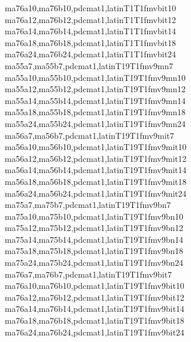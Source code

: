         {ma76a10,ma76b10,pdcmat1,latin}{T1}{T1}{fmv}{b}{it}{10}
        {ma76a12,ma76b12,pdcmat1,latin}{T1}{T1}{fmv}{b}{it}{12}
        {ma76a14,ma76b14,pdcmat1,latin}{T1}{T1}{fmv}{b}{it}{14}
        {ma76a18,ma76b18,pdcmat1,latin}{T1}{T1}{fmv}{b}{it}{18}
        {ma76a24,ma76b24,pdcmat1,latin}{T1}{T1}{fmv}{b}{it}{24}
        {ma55a7,ma55b7,pdcmat1,latin}{T19}{T1}{fmv9}{m}{n}{7}
        {ma55a10,ma55b10,pdcmat1,latin}{T19}{T1}{fmv9}{m}{n}{10}
        {ma55a12,ma55b12,pdcmat1,latin}{T19}{T1}{fmv9}{m}{n}{12}
        {ma55a14,ma55b14,pdcmat1,latin}{T19}{T1}{fmv9}{m}{n}{14}
        {ma55a18,ma55b18,pdcmat1,latin}{T19}{T1}{fmv9}{m}{n}{18}
        {ma55a24,ma55b24,pdcmat1,latin}{T19}{T1}{fmv9}{m}{n}{24}
        {ma56a7,ma56b7,pdcmat1,latin}{T19}{T1}{fmv9}{m}{it}{7}
        {ma56a10,ma56b10,pdcmat1,latin}{T19}{T1}{fmv9}{m}{it}{10}
        {ma56a12,ma56b12,pdcmat1,latin}{T19}{T1}{fmv9}{m}{it}{12}
        {ma56a14,ma56b14,pdcmat1,latin}{T19}{T1}{fmv9}{m}{it}{14}
        {ma56a18,ma56b18,pdcmat1,latin}{T19}{T1}{fmv9}{m}{it}{18}
        {ma56a24,ma56b24,pdcmat1,latin}{T19}{T1}{fmv9}{m}{it}{24}
        {ma75a7,ma75b7,pdcmat1,latin}{T19}{T1}{fmv9}{b}{n}{7}
        {ma75a10,ma75b10,pdcmat1,latin}{T19}{T1}{fmv9}{b}{n}{10}
        {ma75a12,ma75b12,pdcmat1,latin}{T19}{T1}{fmv9}{b}{n}{12}
        {ma75a14,ma75b14,pdcmat1,latin}{T19}{T1}{fmv9}{b}{n}{14}
        {ma75a18,ma75b18,pdcmat1,latin}{T19}{T1}{fmv9}{b}{n}{18}
        {ma75a24,ma75b24,pdcmat1,latin}{T19}{T1}{fmv9}{b}{n}{24}
        {ma76a7,ma76b7,pdcmat1,latin}{T19}{T1}{fmv9}{b}{it}{7}
        {ma76a10,ma76b10,pdcmat1,latin}{T19}{T1}{fmv9}{b}{it}{10}
        {ma76a12,ma76b12,pdcmat1,latin}{T19}{T1}{fmv9}{b}{it}{12}
        {ma76a14,ma76b14,pdcmat1,latin}{T19}{T1}{fmv9}{b}{it}{14}
        {ma76a18,ma76b18,pdcmat1,latin}{T19}{T1}{fmv9}{b}{it}{18}
        {ma76a24,ma76b24,pdcmat1,latin}{T19}{T1}{fmv9}{b}{it}{24}
